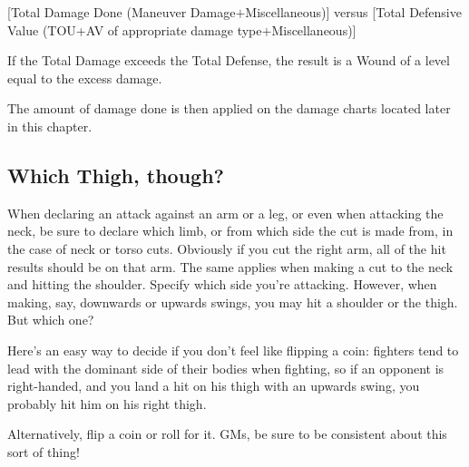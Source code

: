 \documentclass[oneside,11pt,english]{book}
\begin{document}
[Total Damage Done (Maneuver Damage$ + $Miscellaneous)] versus [Total Defensive Value (TOU+AV of appropriate damage type$ + $Miscellaneous)]

If the Total Damage exceeds the Total Defense, the result is a Wound of a level equal to the excess 
damage.

The amount of damage done is then applied on the damage charts located later in this chapter.

\subsection*{Which Thigh, though?}
When declaring an attack against an arm or a leg, or even when attacking the neck, be sure to declare 
which limb, or from which side the cut is made from, in the case of neck or torso cuts. Obviously if you 
cut the right arm, all of the hit results should be on that arm. The same applies when making a cut to the 
neck and hitting the shoulder. Specify which side you’re attacking.
However, when making, say, downwards or upwards swings, you may hit a shoulder or the thigh. But 
which one?

Here’s an easy way to decide if you don’t feel like flipping a coin: fighters tend to lead with the dominant 
side of their bodies when fighting, so if an opponent is right-handed, and you land a hit on his thigh with 
an upwards swing, you probably hit him on his right thigh.

Alternatively, flip a coin or roll for it. GMs, be sure to be consistent about this sort of thing!
\newpage
\end{document}
